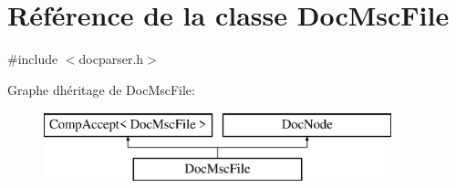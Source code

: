 \hypertarget{class_doc_msc_file}{}\section{Référence de la classe Doc\+Msc\+File}
\label{class_doc_msc_file}


{\ttfamily \#include $<$docparser.\+h$>$}

Graphe d\textquotesingle{}héritage de Doc\+Msc\+File\+:\begin{figure}[H]
\begin{center}
\leavevmode
\includegraphics[height=2.000000cm]{class_doc_msc_file}
\end{center}
\end{figure}
